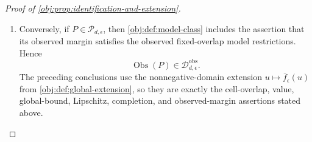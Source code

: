 \documentclass[11pt]{article}
\begin{document}
\begin{proof}[Proof of \cref{obj:prop:identification-and-extension}]
\begin{enumerate}
The construction gives consistency because atoms with \(y\ne y_a\) have mass zero.  Its observed
margin is \(\mathbb P\), since
\[
\sum_{y_0,y_1\in\{0,1\}}P^{\mathrm B}(x,a,y,y_0,y_1)
=
q_{ay,x}\sum_{y_{1-a}\in\{0,1\}}\operatorname{bm}(\mu_{1-a,x},y_{1-a})
=q_{ay,x}.
\]
Using the observed-law factorization supplied by \cref{obj:def:observed-model-class},
\[
q_{ay,x}
=
p_x\,\operatorname{bm}(\pi_x,a)\,\operatorname{bm}(\mu_{ax},y),
\]
the potential-outcome atom obtained after summing over the observed outcome factors as
\[
\sum_{y\in\{0,1\}}P^{\mathrm B}(x,a,y,y_0,y_1)
=
p_x\,\operatorname{bm}(\pi_x,a)\,\operatorname{bm}(\mu_{0x},y_0)\,\operatorname{bm}(\mu_{1x},y_1).
\]
Consequently, conditionally on \(X=x\), treatment is Bernoulli with parameter \(\pi_x\), independent
of the joint potential-outcome vector, and \(Y(0),Y(1)\) are independent Bernoulli variables with
parameters \(\mu_{0x}\) and \(\mu_{1x}\).  The observed margin is \(\mathbb P\), so its overlap
properties are exactly those of the given observed law; together with consistency and conditional
exchangeability, \cref{obj:def:model-class} places \(P^{\mathrm B}\) in \(\mathcal P_{d,\epsilon}\). %

\item Conversely, if \(P\in\mathcal P_{d,\epsilon}\), then \cref{obj:def:model-class} includes the
assertion that its observed margin satisfies the observed fixed-overlap model restrictions.  Hence
\[
\operatorname{Obs}(P)\in\mathcal D_{d,\epsilon}^{\mathrm{obs}}.
\]
The preceding conclusions use the nonnegative-domain extension \(u\mapsto\bar f_\epsilon(u)\) from
\cref{obj:def:global-extension}, so they are exactly the cell-overlap, value, global-bound,
Lipschitz, completion, and observed-margin assertions stated above. %
\end{enumerate}
\end{proof}
\end{document}
